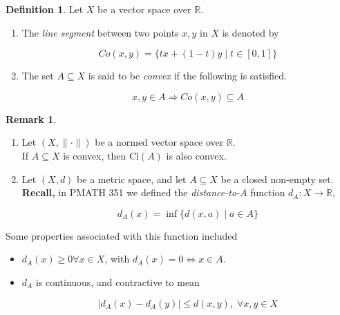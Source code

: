 \documentclass[11pt]{amsart}
\theoremstyle{definition}
\newtheorem{definition}[theorem]{Definition}
\newtheorem{remark}[theorem]{Remark}
\numberwithin{equation}{section}
\newcommand{\bR}{ \mathbb{R} }	%
\newcommand{\nvs}{\left(X, \| \cdot \| \right)}					%
\newcommand{\ms}{\left(X, d \right)}							%
\begin{document}
\begin{definition}\label{def:21} Let $X$ be a vector space over $\bR$. 
\begin{enumerate}
\item The \textit{line segment} between two points $x,y$ in $X$ is denoted by

\[\label{eq:Lin-Seg} \tag{Lin-Seg} Co(x,y) = \{tx + (1-t)y \; | \; t \in [0,1] \} \]

\vspace{6pt}

\item The set $A \subseteq X$ is said to be \textit{convex} if the following is satisfied. 

\[\label{eq:Convex} \tag{Convex} x,y \in A \Rightarrow Co(x,y) \subseteq A \]
\end{enumerate}
\end{definition}

\vspace{6pt}

\begin{remark}\label{rem:22} 
\begin{enumerate}
\item Let $\nvs$ be a normed vector space over $\bR$. \\ If $A \subseteq X$ is convex, then Cl$(A)$ is also convex. 

\vspace{6pt}

\item Let $\ms$ be a metric space, and let $A \subseteq X$ be a closed non-empty set. \\ 
\textbf{Recall, } in PMATH 351 we defined the \textit{distance-to-$A$} function $d_A: X \rightarrow \bR$,

\[\label{eq:dist-to-A} \tag{dist-to-$A$} d_A(x) = \inf \{d(x,a) \; | \; a \in A \} \]
\end{enumerate}
\end{remark}

Some properties associated with this function included  
\begin{itemize}
\item $d_A(x) \ge 0 \forall x \in X$, with $d_A(x) = 0 \Leftrightarrow x \in A$. 

\item $d_A$ is continuous, and contractive to mean

\[ |d_A(x) - d_A(y)| \le d(x,y), \; \forall x,y \in X \]
\end{itemize}
\end{document}
